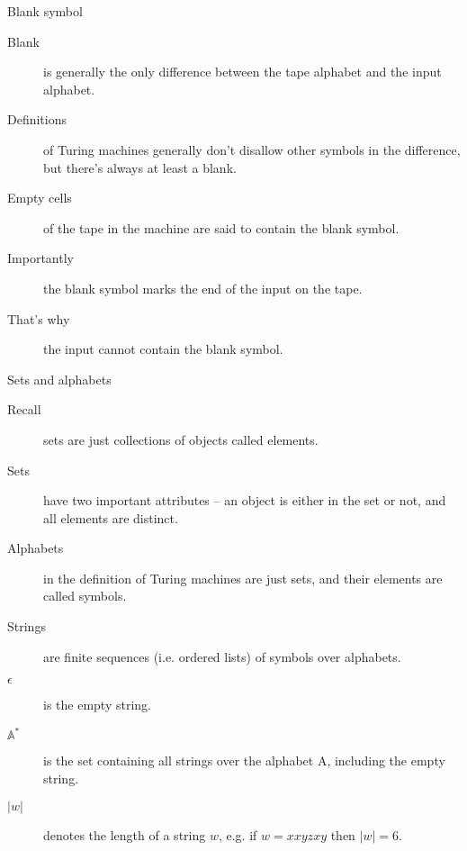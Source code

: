 \begin{frame}{Blank symbol}

\begin{description}
  \item[Blank] is generally the only difference between the tape alphabet and the input alphabet.
  \item[Definitions] of Turing machines generally don't disallow other symbols in the difference, but there's always at least a blank.
  \item[Empty cells] of the tape in the machine are said to contain the blank symbol.
  \item[Importantly] the blank symbol marks the end of the input on the tape.
  \item[That's why] the input cannot contain the blank symbol.
\end{description}

\end{frame}


\begin{frame}{Sets and alphabets}

\begin{description}
  \item[Recall] sets are just collections of objects called elements.
  \item[Sets] have two important attributes -- an object is either in the set or not, and all elements are distinct.
  \item[Alphabets] in the definition of Turing machines are just sets, and their elements are called symbols.
  \item[Strings] are finite sequences (i.e. ordered lists) of symbols over alphabets.
  \item[$\epsilon$] is the empty string.
  \item[$\mathbb{A}^*$] is the set containing all strings over the alphabet A, including the empty string.
  \item[$|w|$] denotes the length of a string $w$, e.g. if $w = xxyzxy$ then $|w| = 6$.
\end{description}
\end{frame}

